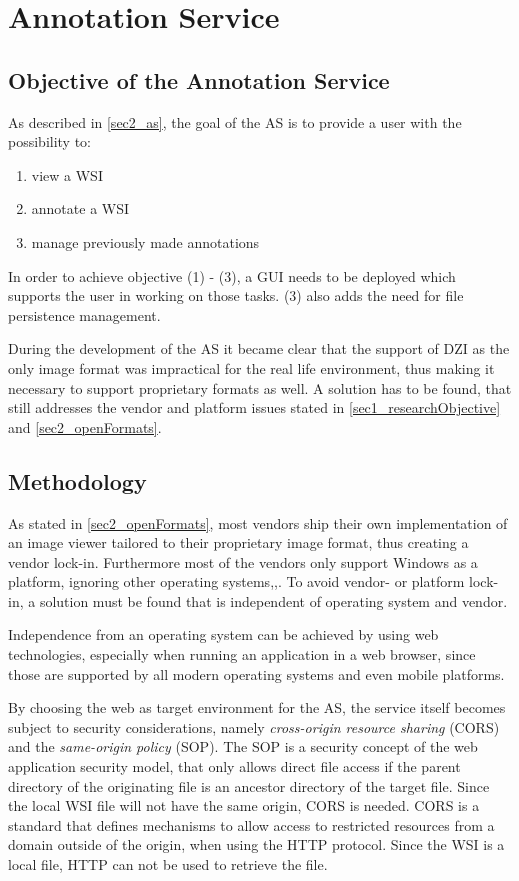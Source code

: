 \chapter{Annotation Service}
\label{sec4_as}

\section{Objective of the Annotation Service}
\label{sec4_objective}
As described in \ref{sec2_as}, the goal of the AS is to provide a user with the possibility to:
\begin{enumerate}[(1)]
	\item view a WSI
	\item annotate a WSI
	\item manage previously made annotations
\end{enumerate}

In order to achieve objective (1) - (3), a GUI needs to be deployed which supports the user in working on those tasks. (3) also adds the need for file persistence management.

During the development of the AS it became clear that the support of DZI as the only image format was impractical for the real life environment, thus making it necessary to support proprietary formats as well. A solution has to be found, that still addresses the vendor and platform issues stated in \ref{sec1_researchObjective} and \ref{sec2_openFormats}.


\section{Methodology}
\label{sec4_methodology}
As stated in \ref{sec2_openFormats}, most vendors ship their own implementation of an image viewer tailored to their proprietary image format, thus creating a vendor lock-in. Furthermore most of the vendors only support Windows as a platform, ignoring other operating systems\cite{Cornish13},\cite{DICOM10},\cite{Farahanil15}. To avoid vendor- or platform lock-in, a solution must be found that is independent of operating system and vendor.

Independence from an operating system can be achieved by using web technologies, especially when running an application in a web browser, since those are supported by all modern operating systems and even mobile platforms\cite{Tseytlin14}.

By choosing the web as target environment for the AS, the service itself becomes subject to security considerations, namely \emph{cross-origin resource sharing} (CORS)\cite{Kesteren14} and the \emph{same-origin policy} (SOP)\cite{web:mdn}. The SOP is a security concept of the web application security model, that only allows direct file access if the parent directory of the originating file is an ancestor directory of the target file\cite{web:mdn}. Since the local WSI file will not have the same origin, CORS is needed. CORS is a standard that defines mechanisms to allow access to restricted resources from a domain outside of the origin, when using the HTTP protocol\cite{Kesteren14}. Since the WSI is a local file, HTTP can not be used to retrieve the file.

